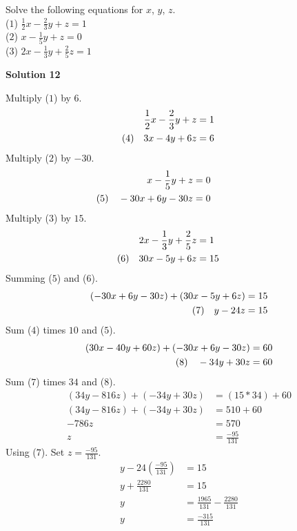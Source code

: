 \begin{tcolorbox}[title=Problem 12, breakable]
    Solve the following equations for $x$, $y$, $z$. \\
    ($1$) $\frac{1}{2}x - \frac{2}{3}y + z = 1$ \\
    ($2$) $x - \frac{1}{5}y + z = 0$ \\
    ($3$) $2x - \frac{1}{3}y + \frac{2}{5}z = 1$
\end{tcolorbox}

\textbf{Solution 12}

Multiply ($1$) by $6$.
\begin{align*}
    \frac{1}{2}x - \frac{2}{3}y + z &= 1 \\
    \hspace{-2cm}\text{(4)}\quad 3x - 4y + 6z &= 6
\end{align*}
Multiply ($2$) by $-30$.
\begin{align*}
    x - \frac{1}{5}y + z &= 0 \\
    \hspace{-2cm}\text{(5)}\quad -30x + 6y - 30z &= 0
\end{align*}
Multiply ($3$) by $15$.
\begin{align*}
    2x - \frac{1}{3}y + \frac{2}{5}z &= 1 \\
    \hspace{-2cm}\text{(6)}\quad 30x - 5y + 6z &= 15
\end{align*}
Summing ($5$) and ($6$).
\begin{align*}
    (-30x + 6y - 30z) + (30x - 5y + 6z ) &= 15 \\
    \hspace{-2cm}\text{(7)}\quad y - 24z &= 15 
\end{align*}
Sum ($4$) times $10$ and ($5$).
\begin{align*}
    (30x - 40y + 60z) + (-30x + 6y - 30z) &= 60 \\
    \hspace{-2cm}\text{(8)}\quad -34y + 30z &= 60
\end{align*}
Sum ($7$) times $34$ and ($8$).
\begin{align*}
    (34y - 816z) + (-34y + 30z) &= (15 * 34) + 60 \\
    (34y - 816z) + (-34y + 30z) &= 510 + 60 \\
    -786z &= 570 \\
    z &= \frac{-95}{131}
\end{align*}
Using ($7$). Set $z = \frac{-95}{131}$.
\begin{align*}
    y - 24(\frac{-95}{131}) &= 15 \\
    y + \frac{2280}{131} &= 15 \\
    y &= \frac{1965}{131} - \frac{2280}{131} \\
    y &= \frac{-315}{131}
\end{align*}

